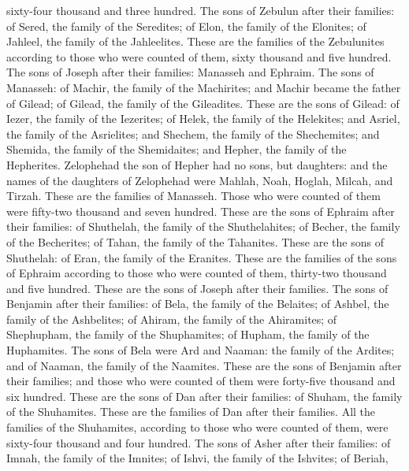 sixty-four thousand and three hundred.  The sons of Zebulun
after their families: of Sered, the family of the Seredites; of Elon,
the family of the Elonites; of Jahleel, the family of the Jahleelites.
 These are the families of the Zebulunites according to
those who were counted of them, sixty thousand and five hundred.
 The sons of Joseph after their families: Manasseh and
Ephraim.  The sons of Manasseh: of Machir, the family of
the Machirites; and Machir became the father of Gilead; of Gilead, the
family of the Gileadites.  These are the sons of Gilead: of
Iezer, the family of the Iezerites; of Helek, the family of the
Helekites;  and Asriel, the family of the Asrielites; and
Shechem, the family of the Shechemites;  and Shemida, the
family of the Shemidaites; and Hepher, the family of the Hepherites.
 Zelophehad the son of Hepher had no sons, but daughters:
and the names of the daughters of Zelophehad were Mahlah, Noah, Hoglah,
Milcah, and Tirzah.  These are the families of Manasseh.
Those who were counted of them were fifty-two thousand and seven
hundred.  These are the sons of Ephraim after their
families: of Shuthelah, the family of the Shuthelahites; of Becher, the
family of the Becherites; of Tahan, the family of the Tahanites.
 These are the sons of Shuthelah: of Eran, the family of
the Eranites.  These are the families of the sons of
Ephraim according to those who were counted of them, thirty-two thousand
and five hundred. These are the sons of Joseph after their families.
 The sons of Benjamin after their families: of Bela, the
family of the Belaites; of Ashbel, the family of the Ashbelites; of
Ahiram, the family of the Ahiramites;  of Shephupham, the
family of the Shuphamites; of Hupham, the family of the Huphamites.
 The sons of Bela were Ard and Naaman: the family of the
Ardites; and of Naaman, the family of the Naamites.  These
are the sons of Benjamin after their families; and those who were
counted of them were forty-five thousand and six hundred. 
These are the sons of Dan after their families: of Shuham, the family of
the Shuhamites. These are the families of Dan after their families.
 All the families of the Shuhamites, according to those who
were counted of them, were sixty-four thousand and four hundred.
 The sons of Asher after their families: of Imnah, the
family of the Imnites; of Ishvi, the family of the Ishvites; of Beriah,
